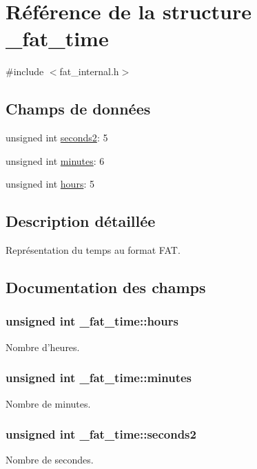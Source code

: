 \hypertarget{struct__fat__time}{\section{\-Référence de la structure \-\_\-fat\-\_\-time}
\label{struct__fat__time}
}


{\ttfamily \#include $<$fat\-\_\-internal.\-h$>$}

\subsection*{\-Champs de données}
\begin{DoxyCompactItemize}
\item 
unsigned int \hyperlink{struct__fat__time_ab02d4606058041887618d3b9beb92749}{seconds2}\-: 5
\item 
unsigned int \hyperlink{struct__fat__time_a92c31beaa1318e3ddf1457a57c30f1aa}{minutes}\-: 6
\item 
unsigned int \hyperlink{struct__fat__time_a7a3028be0bfed0b785e012d88c45f873}{hours}\-: 5
\end{DoxyCompactItemize}


\subsection{\-Description détaillée}
\-Représentation du temps au format \-F\-A\-T. 

\subsection{\-Documentation des champs}
\hypertarget{struct__fat__time_a7a3028be0bfed0b785e012d88c45f873}{
\subsubsection[{hours}]{\setlength{\rightskip}{0pt plus 5cm}unsigned int {\bf \-\_\-fat\-\_\-time\-::hours}}}\label{struct__fat__time_a7a3028be0bfed0b785e012d88c45f873}
\-Nombre d'heures. \hypertarget{struct__fat__time_a92c31beaa1318e3ddf1457a57c30f1aa}{
\subsubsection[{minutes}]{\setlength{\rightskip}{0pt plus 5cm}unsigned int {\bf \-\_\-fat\-\_\-time\-::minutes}}}\label{struct__fat__time_a92c31beaa1318e3ddf1457a57c30f1aa}
\-Nombre de minutes. \hypertarget{struct__fat__time_ab02d4606058041887618d3b9beb92749}{
\subsubsection[{seconds2}]{\setlength{\rightskip}{0pt plus 5cm}unsigned int {\bf \-\_\-fat\-\_\-time\-::seconds2}}}\label{struct__fat__time_ab02d4606058041887618d3b9beb92749}
\-Nombre de secondes. 

